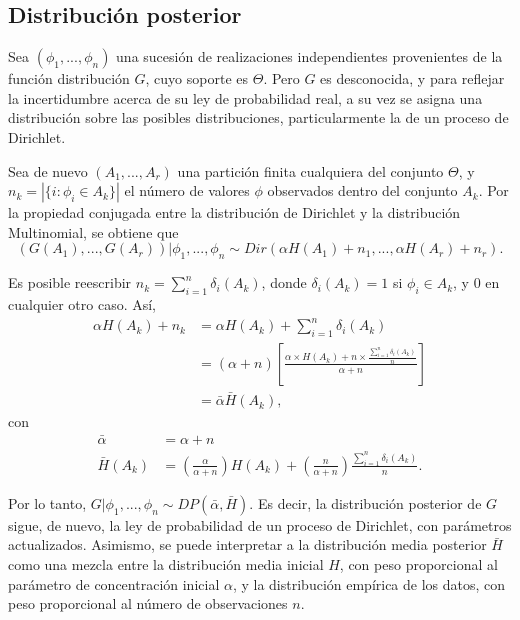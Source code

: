 \subsection{Distribuci\'on posterior}

Sea $(\phi_1,..., \phi_n)$ una sucesi\'on de realizaciones independientes provenientes de la funci\'on distribuci\'on $G$, cuyo soporte es $\Theta$. Pero $G$ es desconocida, y para reflejar la incertidumbre acerca de su ley de probabilidad real, a su vez se asigna una distribuci\'on sobre las posibles distribuciones, particularmente la de un proceso de Dirichlet.

Sea de nuevo $(A_1,...,A_r)$ una partici\'on finita cualquiera del conjunto $\Theta$, y $n_k = |\{i: \phi_i \in A_k\}|$ el n\'umero de valores $\phi$ observados dentro del conjunto $A_k$. Por la propiedad conjugada entre la distribuci\'on de Dirichlet y la distribuci\'on Multinomial, se obtiene que
\begin{equation*}
   (G(A_1),...,G(A_r))|\phi_1,...,\phi_n \sim Dir(\alpha H(A_1) + n_1,...,\alpha H(A_r) + n_r). 
\end{equation*}

Es posible reescribir $n_k = \sum_{i=1}^n \delta_i(A_k)$, donde $\delta_i(A_k) = 1$ si $\phi_i \in A_k$, y $0$ en cualquier otro caso. As\'i,
\begin{equation*}
\begin{aligned}
    \alpha H(A_k) + n_k 
    &= \alpha H(A_k) + \sum_{i=1}^n \delta_i(A_k) \\
    &= (\alpha + n)
    \left[
        \frac{\alpha \times H(A_k) + n \times \frac{\sum_{i=1}^n \delta_i(A_k)}{n}}{\alpha + n}
    \right] \\
    &= \bar{\alpha} \bar{H}(A_k),
\end{aligned}
\end{equation*}
con
\begin{equation*}
\begin{aligned}
    \bar{\alpha} &= \alpha + n \\
    \bar{H}(A_k) &=  
        \left(\frac{\alpha}{\alpha + n}\right)H(A_k) + 
        \left(\frac{n}{\alpha + n}\right)\frac{\sum_{i=1}^n \delta_i(A_k)}{n}.
\end{aligned}
\end{equation*}

Por lo tanto, $G|\phi_1,...,\phi_n \sim DP(\bar{\alpha},\bar{H})$. Es decir, la distribuci\'on posterior de $G$ sigue, de nuevo, la ley de probabilidad de un proceso de Dirichlet, con par\'ametros actualizados. Asimismo, se puede interpretar a la distribuci\'on media posterior $\bar{H}$ como una mezcla entre la distribuci\'on media inicial $H$, con peso proporcional al par\'ametro de concentraci\'on inicial $\alpha$, y la distribuci\'on emp\'irica de los datos, con peso proporcional al n\'umero de observaciones $n$. 

